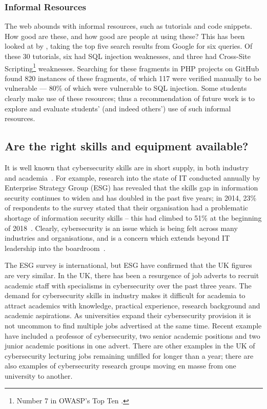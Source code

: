 \documentclass[sigconf]{acmart}
\begin{document}
\subsubsection{Informal Resources}
The web abounds with informal resources, such as tutorials and code snippets. How good are these, and how good are people at using these? This has been looked at by \cite{Unruhetal2017a}, taking the top five search results from Google for six queries. Of these 30 tutorials, six had SQL injection weaknesses, and three had Cross-Site Scripting\footnote{Number 7 in OWASP's Top Ten \cite{OWASP2017a}.} weaknesses. Searching for these fragments in PHP projects on GitHub found 820 instances of these fragments, of which 117 were verified manually to be vulnerable --- 80\% of which were vulnerable to SQL injection. Some students clearly make use of these resources; thus a recommendation of future work is to explore and evaluate students' (and indeed others') use of such informal resources. 

\subsection{Are the right skills and equipment available?}
It is well known that cybersecurity skills are in short supply, in both industry~\cite{Ackerman2019a} and academia~\cite{schneider2013}. For example, research into the state of IT conducted annually by Enterprise Strategy Group (ESG) has revealed that the skills gap in information security continues to widen and has doubled in the past five years; in 2014, 23\% of respondents to the survey stated that their organisation had a problematic shortage of information security skills -- this had climbed to 51\% at the beginning of 2018~\cite{ESG:2018}. Clearly, cybersecurity is an issue which is being felt across many industries and organisations, and is a concern which extends beyond IT leadership into the boardroom~\cite{Ackerman2019a}.

The ESG survey is international, but ESG have confirmed that the UK figures are very similar. In the UK, there has been a resurgence of job adverts to recruit academic staff with specialisms in cybersecurity over the past three years. The demand for cybersecurity skills in industry makes it difficult for academia to attract academics with knowledge, practical experience, research background and academic aspirations. As universities expand their cybersecurity provision it is not uncommon to find multiple jobs advertised at the same time. Recent example have included a professor of cybersecurity, two senior academic positions and two junior academic positions in one advert. There are other examples in the UK of cybersecurity lecturing jobs remaining unfilled for longer than a year; there are also examples of cybersecurity research groups moving en masse from one university to another.
\end{document}
